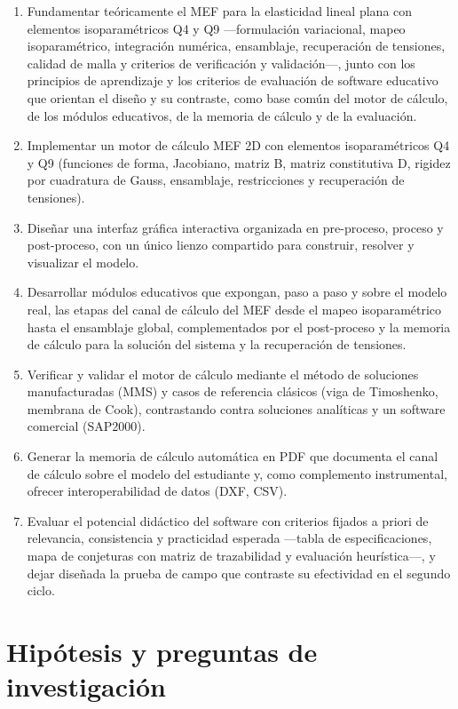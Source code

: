 \begin{enumerate}
    \item Fundamentar teóricamente el MEF para la elasticidad lineal plana con elementos isoparamétricos Q4 y Q9 —formulación variacional, mapeo isoparamétrico, integración numérica, ensamblaje, recuperación de tensiones, calidad de malla y criterios de verificación y validación—, junto con los principios de aprendizaje y los criterios de evaluación de software educativo que orientan el diseño y su contraste, como base común del motor de cálculo, de los módulos educativos, de la memoria de cálculo y de la evaluación.
    \item Implementar un motor de cálculo MEF 2D con elementos isoparamétricos Q4 y Q9 (funciones de forma, Jacobiano, matriz B, matriz constitutiva D, rigidez por cuadratura de Gauss, ensamblaje, restricciones y recuperación de tensiones).
    \item Diseñar una interfaz gráfica interactiva organizada en pre-proceso, proceso y post-proceso, con un único lienzo compartido para construir, resolver y visualizar el modelo.
    \item Desarrollar módulos educativos que expongan, paso a paso y sobre el modelo real, las etapas del canal de cálculo del MEF desde el mapeo isoparamétrico hasta el ensamblaje global, complementados por el post-proceso y la memoria de cálculo para la solución del sistema y la recuperación de tensiones.
    \item Verificar y validar el motor de cálculo mediante el método de soluciones manufacturadas (MMS) y casos de referencia clásicos (viga de Timoshenko, membrana de Cook), contrastando contra soluciones analíticas y un software comercial (SAP2000).
    \item Generar la memoria de cálculo automática en PDF que documenta el canal de cálculo sobre el modelo del estudiante y, como complemento instrumental, ofrecer interoperabilidad de datos (DXF, CSV).
    \item Evaluar el potencial didáctico del software con criterios fijados a priori de relevancia, consistencia y practicidad esperada —tabla de especificaciones, mapa de conjeturas con matriz de trazabilidad y evaluación heurística—, y dejar diseñada la prueba de campo que contraste su efectividad en el segundo ciclo.
\end{enumerate}

\section*{Hipótesis y preguntas de investigación}

